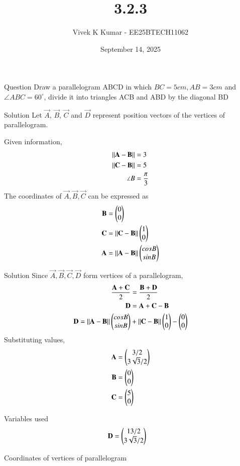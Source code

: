 \documentclass{beamer}
\title 
{3.2.3}
\date{September 14, 2025}
\author 
{Vivek K Kumar - EE25BTECH11062}
\begin{document}
\frame{\titlepage}
\begin{frame}{Question}
Draw a parallelogram ABCD in which $BC = 5cm, AB = 3cm$ and $\angle ABC = 60^\circ $, divide it into triangles ACB and ABD by the diagonal BD
\end{frame}

\begin{frame}{Solution}
Let $\vec{A}$, $\vec{B}$, $\vec{C}$ and $\vec{D}$ represent position vectors of the vertices of parallelogram.

Given information, 
\begin{align}
\left\lVert\mathbf{A-B}\right\rVert &= 3 \\
\left\lVert\mathbf{C-B}\right\rVert &= 5 \\
\angle B &= \frac{\pi}{3}
\end{align}
The coordinates of $\vec{A}, \vec{B}, \vec{C}$ can be expressed as
\begin{align}
\mathbf{B} &= \begin{pmatrix}0\\0\end{pmatrix} \\
\mathbf{C} &= \left\lVert\mathbf{C-B}\right\rVert\begin{pmatrix}1\\0\end{pmatrix} \\
\mathbf{A} &= \left\lVert\mathbf{A-B}\right\rVert\begin{pmatrix}cosB\\sinB\end{pmatrix} 
\end{align}
\end{frame}
\begin{frame}{Solution}
Since $\vec{A}, \vec{B}, \vec{C}, \vec{D}$ form vertices of a parallelogram,
\begin{align}
\frac{\mathbf{A}+\mathbf{C}}{2} &= \frac{\mathbf{B}+\mathbf{D}}{2} \\
\mathbf{D} &= \mathbf{A+C-B}\\
\mathbf{D} = \left\lVert\mathbf{A}-\mathbf{B}\right\rVert\begin{pmatrix}cosB\\sinB\end{pmatrix} &+  \left\lVert\mathbf{C}-\mathbf{B}\right\rVert\begin{pmatrix}1\\0\end{pmatrix} - \begin{pmatrix}0\\0\end{pmatrix}
\end{align}
Substituting values, 
\begin{align}
    \mathbf{A} &= \begin{pmatrix}3/2 \\ 3\sqrt{3}/{2}\end{pmatrix} \\
    \mathbf{B} &= \begin{pmatrix}0 \\ 0\end{pmatrix} \\
    \mathbf{C} &= \begin{pmatrix}5 \\ 0\end{pmatrix}
\end{align}
\end{frame}

\begin{frame}{Variables used}
\begin{align}
\mathbf{D} &= \begin{pmatrix}13/2 \\ 3\sqrt{3}/2\end{pmatrix}
\end{align}
\begin{table}[H]    
  \centering
  
  \caption{Coordinates of vertices of parallelogram}
  \label{tab:2.9.13}
\end{table}

\end{frame}
\end{document}
